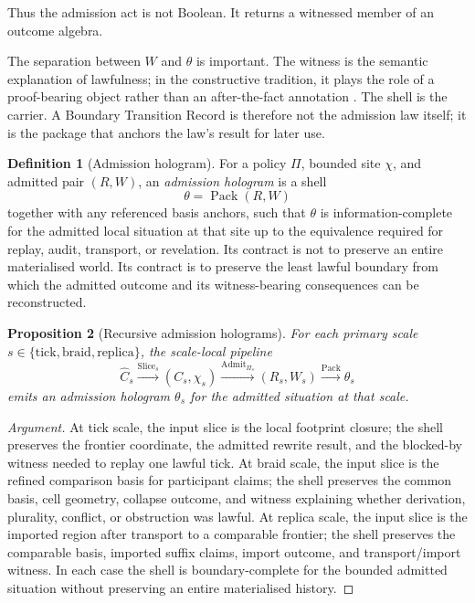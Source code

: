 \documentclass[11pt]{article}
\theoremstyle{definition}
\newtheorem{definition}{Definition}[section]
\theoremstyle{plain}
\newtheorem{proposition}[definition]{Proposition}
\theoremstyle{remark}
\newenvironment{argument}{\begin{proof}[Argument]}{\end{proof}}
\begin{document}
Thus the admission act is not Boolean. It returns a witnessed member of an
outcome algebra.

The separation between \(W\) and \(\theta\) is important. The witness is the semantic explanation of lawfulness; in the constructive tradition, it plays the role of a proof-bearing object rather than an after-the-fact annotation \cite{martinlof1984intuitionistic}. The shell is the carrier. A Boundary Transition Record is therefore not the admission law itself; it is the package that anchors the law's result for later use.

\begin{definition}[Admission hologram]
For a policy \(\Pi\), bounded site \(\chi\), and admitted pair \((R, W)\), an
\emph{admission hologram} is a shell
\[
\theta = \operatorname{Pack}(R, W)
\]
together with any referenced basis anchors, such that \(\theta\) is
information-complete for the admitted local situation at that site up to the
equivalence required for replay, audit, transport, or revelation. Its contract
is not to preserve an entire materialised world. Its contract is to preserve
the least lawful boundary from which the admitted outcome and its
witness-bearing consequences can be reconstructed.
\end{definition}

\begin{proposition}[Recursive admission holograms]
For each primary scale
\(s \in \{\mathrm{tick}, \mathrm{braid}, \mathrm{replica}\}\),
the scale-local pipeline
\[
\widehat{C}_s
\xrightarrow{\operatorname{Slice}_s}
(C_s,\chi_s)
\xrightarrow{\operatorname{Admit}_{\Pi_s}}
(R_s,W_s)
\xrightarrow{\operatorname{Pack}}
\theta_s
\]
emits an admission hologram \(\theta_s\) for the admitted situation at that scale.
\end{proposition}

\begin{argument}
At tick scale, the input slice is the local footprint closure; the shell preserves the frontier coordinate, the admitted rewrite result, and the blocked-by witness needed to replay one lawful tick. At braid scale, the input slice is the refined comparison basis for participant claims; the shell preserves the common basis, cell geometry, collapse outcome, and witness explaining whether derivation, plurality, conflict, or obstruction was lawful. At replica scale, the input slice is the imported region after transport to a comparable frontier; the shell preserves the comparable basis, imported suffix claims, import outcome, and transport/import witness. In each case the shell is boundary-complete for the bounded admitted situation without preserving an entire materialised history.
\end{argument}
\end{document}
